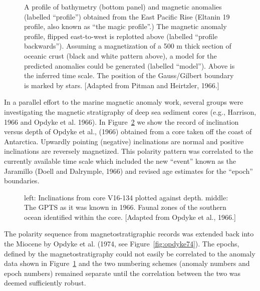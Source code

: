 \begin{figure}[h!tb]
\epsfxsize 12cm
\centering {}
\caption{A profile of bathymetry (bottom panel) and magnetic anomalies (labelled ``profile'') obtained from the East Pacific Rise (Eltanin 19 profile, also known as ``the magic profile''.)  The magnetic anomaly profile,  flipped east-to-west is replotted above (labelled ``profile backwards'').  Assuming a magnetization of a 500 m thick section of oceanic crust (black and white pattern above),  a model for the predicted anomalies could be generated (labelled ``model'').   Above is the inferred time scale.  The position of the Gauss/Gilbert boundary is marked by stars.   [Adapted from  Pitman and Heirtzler, 1966.]}
\label{fig:pitman66}
\end{figure}
\eject


In a parallel effort to the marine magnetic anomaly work, several groups were investigating the magnetic stratigraphy of deep sea sediment cores (e.g.,
 Harrison, 1966 and 
 Opdyke et al. 1966).   In Figure~\ref{fig:opdyke66} we show the record of inclination versus depth of Opdyke et al., (1966) obtained from  a core taken off the coast of Antarctica.    Upwardly pointing (negative)  inclinations are  normal and positive inclinations are reversely magnetized. This polarity pattern was correlated  to the currently available time scale which included the new ``event'' known as the Jaramillo 
(Doell  and Dalrymple, 1966) \nocite{doell66} and revised age estimates for the ``epoch'' boundaries.   \nocite{harrison66} \nocite{opdyke66}  

\begin{figure}[htb]
\epsfxsize 10cm
\centering {}
\caption{left: Inclinations from core V16-134 plotted against depth.  middle: The GPTS as it was known in 1966.  Faunal zones of the southern ocean identified within the core.    [Adapted from  Opdyke et al., 1966.]}
\label{fig:opdyke66}
\end{figure}

The polarity sequence from magnetostratigraphic records was extended back into the Miocene by Opdyke et al.  (1974, see Figure~\ref{fig:opdyke74}).  The epochs, defined by the magnetostratigraphy could not easily be correlated to the anomaly data shown in Figure~\ref{fig:pitman66} and the two numbering schemes (anomaly numbers and epoch numbers) remained separate until the correlation between the two was deemed sufficiently robust.  



